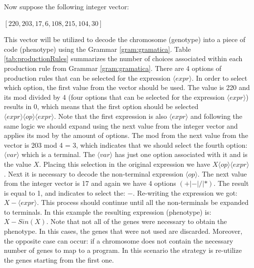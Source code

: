 \documentclass[conference]{IEEEtran}
\begin{document}
\noindent
Now suppose the following integer vector:

\begin{center}
	$ [220, 203, 17, 6, 108, 215, 104, 30] $
\end{center}

This vector will be utilized to decode the chromosome (genotype) into a piece of code (phenotype)  using the Grammar \ref{gram:gramatica}.
Table \ref{tab:productionRules} summarizes the number of choices associated within each production rule from Grammar \ref{gram:gramatica}. There are 4 options of production rules that can be selected for the expression $ \langle expr \rangle$. In order to select which option, the first value from the vector should be used. The value is 220 and its mod divided by 4 (four options that can be selected for the expression $ \langle expr \rangle$) results in 0, which means that the first option should be selected $\langle expr \rangle \langle op \rangle \langle expr \rangle$. Note that the first expression is also $ \langle expr \rangle$ and following the same logic we should expand using the next value from the integer vector and applies its mod by the amount of options. The mod from the next value from the vector is 203 mod 4 = 3, which indicates that we should select the fourth option: $ \langle var \rangle$ which is a terminal. The $ \langle var \rangle$ has just one option associated with it and is the value $X$. Placing this selection in the original expression we have $X \langle op \rangle \langle expr \rangle$. Next it is necessary to decode the non-terminal expression $\langle op \rangle$. The next value from the integer vector is 17 and again we have 4 options $(+ | - | / | *)$. The result is equal to 1, and indicates to select the: $-$. Re-writing the expression we got:  $X  -  \langle expr \rangle$. This process should continue until all the non-terminals be expanded to terminals. In this example the resulting expression (phenotype) is: $X - Sin (X)$. Note that not all of the genes were necessary to obtain the phenotype. In this cases, the genes that were not used are discarded. Moreover, the opposite case can occur: if a chromosome does not contain the necessary number of genes to map to a program. In this scenario the strategy is re-utilize the genes starting from the first one.
\end{document}

